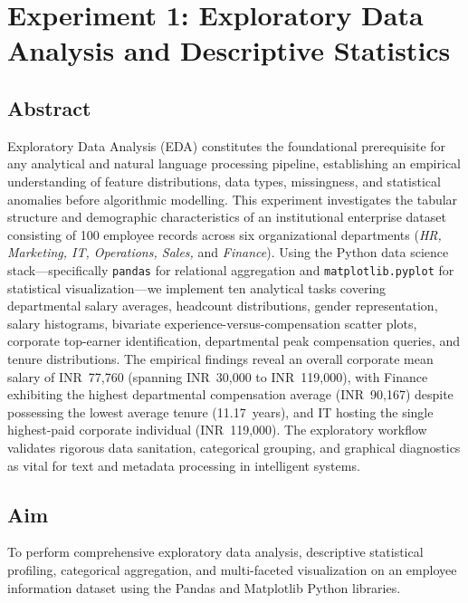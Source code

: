 \chapter{Experiment 1: Exploratory Data Analysis and Descriptive Statistics}
\label{chap:exp1}

\section{Abstract}
Exploratory Data Analysis (EDA) constitutes the foundational prerequisite for any analytical and natural language processing pipeline, establishing an empirical understanding of feature distributions, data types, missingness, and statistical anomalies before algorithmic modelling. This experiment investigates the tabular structure and demographic characteristics of an institutional enterprise dataset consisting of 100 employee records across six organizational departments (\textit{HR, Marketing, IT, Operations, Sales,} and \textit{Finance}). Using the Python data science stack---specifically \texttt{pandas} for relational aggregation and \texttt{matplotlib.pyplot} for statistical visualization---we implement ten analytical tasks covering departmental salary averages, headcount distributions, gender representation, salary histograms, bivariate experience-versus-compensation scatter plots, corporate top-earner identification, departmental peak compensation queries, and tenure distributions. The empirical findings reveal an overall corporate mean salary of INR~77,760 (spanning INR~30,000 to INR~119,000), with Finance exhibiting the highest departmental compensation average (INR~90,167) despite possessing the lowest average tenure (11.17~years), and IT hosting the single highest-paid corporate individual (INR~119,000). The exploratory workflow validates rigorous data sanitation, categorical grouping, and graphical diagnostics as vital for text and metadata processing in intelligent systems.

\section{Aim}
To perform comprehensive exploratory data analysis, descriptive statistical profiling, categorical aggregation, and multi-faceted visualization on an employee information dataset using the Pandas and Matplotlib Python libraries.


